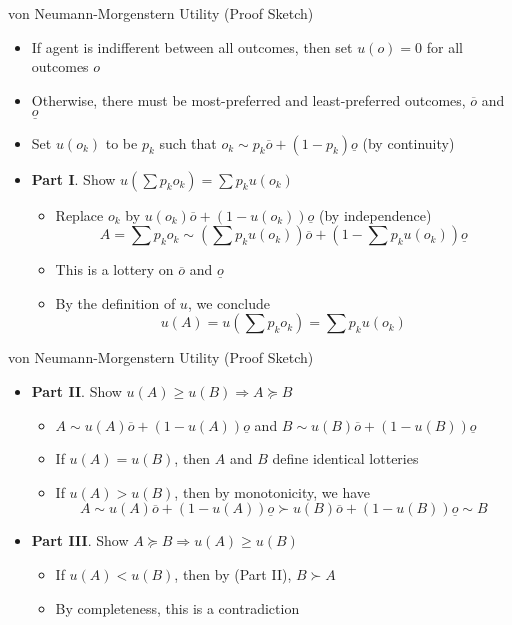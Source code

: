 \documentclass[11pt,aspectratio=169]{beamer}
\begin{document}
  \begin{frame}{von Neumann-Morgenstern Utility (Proof Sketch)}
   \begin{itemize}[<+->]
    \item If agent is indifferent between all outcomes, then set $u(o) = 0$ for all outcomes $o$
    \item Otherwise, there must be most-preferred and least-preferred outcomes, $\overline{o}$ and $\underline{o}$
    \item Set $u(o_k)$ to be $p_k$ such that $o_k \sim p_k\overline{o}+(1-p_k)\underline{o}$ (by \alert{continuity})
    \item \textbf{Part I}. Show $u(\sum p_k o_k) = \sum p_k u(o_k)$
    \begin{itemize}[<.(1)->]
     \item Replace $o_k$ by $u(o_k)\overline{o}+(1-u(o_k))\underline{o}$ (by \alert{independence})
      $$A = \sum p_k o_k \sim \left(\sum p_k u(o_k)\right) \overline{o} + \left(1-\sum p_k u(o_k)\right)\underline{o}$$
     \item This is a lottery on $\overline{o}$ and $\underline{o}$
     \item By the definition of $u$, we conclude
       $$u(A) = u\left(\sum p_k o_k\right) = \sum p_k u(o_k)$$ 
    \end{itemize}
   \end{itemize}
  \end{frame}
  
  \begin{frame}{von Neumann-Morgenstern Utility (Proof Sketch)}
   \begin{itemize}[<+->]
    \item \textbf{Part II}. Show $u(A) \ge u(B) \Longrightarrow A \succeq B$
    \begin{itemize}[<.(1)->]
     \item $A \sim u(A)\overline{o} + (1-u(A))\underline{o}$ and $B \sim u(B)\overline{o} + (1-u(B))\underline{o}$
     \item If $u(A) = u(B)$, then $A$ and $B$ define identical lotteries
     \item If $u(A) > u(B)$, then by \alert{monotonicity}, we have $$A \sim u(A)\overline{o} + (1-u(A))\underline{o} \succ u(B)\overline{o} + (1-u(B))\underline{o} \sim B$$
    \end{itemize}
    \item \textbf{Part III}. Show $A \succeq B \Longrightarrow u(A) \ge u(B)$
    \begin{itemize}[<.(1)->]
     \item If $u(A) < u(B)$, then by (Part II), $B \succ A$
     \item By \alert{completeness}, this is a contradiction
    \end{itemize}
   \end{itemize}
  \end{frame}
  
\end{document}
